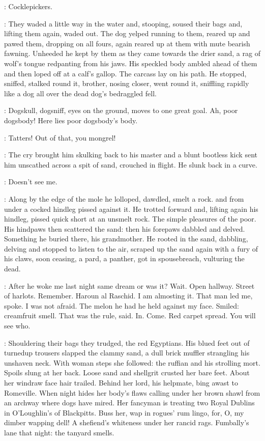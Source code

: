 \StephenInt:
Cocklepickers.

:
They waded a little way in the water and, stooping,
soused their bags and, lifting them again, waded out.
The dog yelped
running to them,
reared up and pawed them,
dropping on all fours,
again reared up at them with mute bearish fawning.
Unheeded
he kept by them
as they came towards the drier sand,
a rag of wolf's tongue redpanting from his jaws.
His speckled body ambled ahead of them
and then loped off at a calf's gallop.
The carcass lay on his path.
He stopped, sniffed, stalked round it,
brother, nosing closer, went round it,
sniffling rapidly like a dog
all over the dead dog's bedraggled fell.

\StephenInt:
Dogskull, dogsniff,
eyes on the ground,
moves to one great goal.
Ah, poor dogsbody!
Here lies poor dogsbody's body.

\man:
Tatters!
Out of that, you mongrel!

:
The cry brought him skulking back to his master
and a blunt bootless kick sent him unscathed
across a spit of sand, crouched in flight.
He slunk back in a curve.

\StephenInt:
Doesn't see me.

:
Along by the edge of the mole
he lolloped, dawdled, smelt a rock.
and from under a cocked hindleg
pissed against it.
He trotted forward and, lifting again his hindleg,
pissed quick short at an unsmelt rock.
The simple pleasures of the poor.
His hindpaws then scattered the sand:
then his forepaws dabbled and delved.
Something he buried there, his grandmother.
He rooted in the sand,
dabbling, delving
and stopped to listen to the air,
scraped up the sand
again with a fury of his claws,
soon ceasing, a pard, a panther,
got in spousebreach,
vulturing the dead.

\StephenInt:
After he woke me last night same dream or was it?
Wait.
Open hallway.
Street of harlots.
Remember.
Haroun al Raschid.
I am almosting it.
That man led me, spoke.
I was not afraid.
The melon he had he held against my face.
Smiled:
creamfruit smell.
That was the rule, said.
In.
Come.
Red carpet spread.
You will see who.

:
Shouldering their bags they trudged, the red Egyptians.
His blued feet out of turnedup trousers
slapped the clammy sand,
a dull brick muffler strangling his unshaven neck.
With woman steps she followed:
the ruffian and his strolling mort.
Spoils slung at her back.
Loose sand and shellgrit crusted her bare feet.
About her windraw face hair trailed.
Behind her lord, his helpmate, bing awast to Romeville.
When night hides her body's flaws
calling under her brown shawl from an archway where dogs have mired.
Her fancyman is treating two Royal Dublins in O'Loughlin's of Blackpitts.
Buss her, wap in rogues' rum lingo,
for, O, my dimber wapping dell!
A shefiend's whiteness under her rancid rags.
Fumbally's lane that night:
the tanyard smells.

